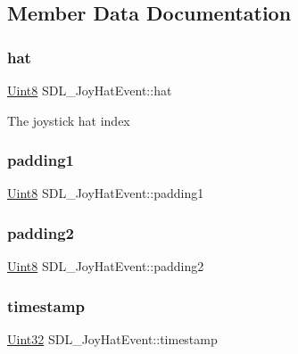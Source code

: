 \subsection{Member Data Documentation}
\mbox{\label{struct_s_d_l___joy_hat_event_ab1b54a6d1091e583e856f86b5af1e2f6}} 
\subsubsection{\texorpdfstring{hat}{hat}}
{\footnotesize\ttfamily \mbox{\hyperlink{_s_d_l__stdinc_8h_a2944638813a090aa23e62f4da842c3e2}{Uint8}} S\+D\+L\+\_\+\+Joy\+Hat\+Event\+::hat}

The joystick hat index \mbox{\label{struct_s_d_l___joy_hat_event_afbe72b6702cf7f70ccbe206737ab2e49}} 
\subsubsection{\texorpdfstring{padding1}{padding1}}
{\footnotesize\ttfamily \mbox{\hyperlink{_s_d_l__stdinc_8h_a2944638813a090aa23e62f4da842c3e2}{Uint8}} S\+D\+L\+\_\+\+Joy\+Hat\+Event\+::padding1}

\mbox{\label{struct_s_d_l___joy_hat_event_adaca3e99773130ae456690ba83feb420}} 
\subsubsection{\texorpdfstring{padding2}{padding2}}
{\footnotesize\ttfamily \mbox{\hyperlink{_s_d_l__stdinc_8h_a2944638813a090aa23e62f4da842c3e2}{Uint8}} S\+D\+L\+\_\+\+Joy\+Hat\+Event\+::padding2}

\mbox{\label{struct_s_d_l___joy_hat_event_ade58ecb3e75aad4ef9809f040519a021}} 
\subsubsection{\texorpdfstring{timestamp}{timestamp}}
{\footnotesize\ttfamily \mbox{\hyperlink{_s_d_l__stdinc_8h_add440eff171ea5f55cb00c4a9ab8672d}{Uint32}} S\+D\+L\+\_\+\+Joy\+Hat\+Event\+::timestamp}

